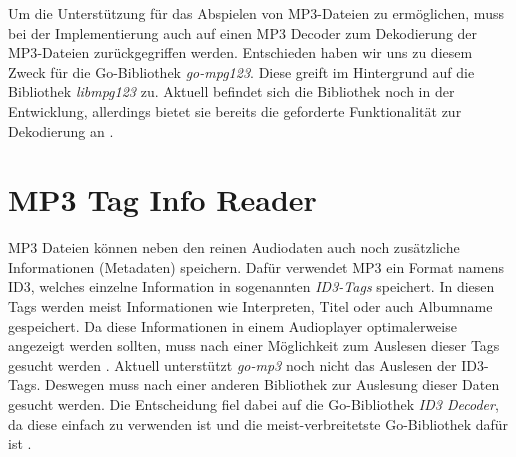 Um die Unterstützung für das Abspielen von \ac{MP3}-Dateien zu ermöglichen, muss bei der Implementierung auch auf einen \ac{MP3} Decoder zum
Dekodierung der \ac{MP3}-Dateien zurückgegriffen werden. Entschieden haben wir uns
zu diesem Zweck für die Go-Bibliothek \textit{go-mpg123}. Diese greift im
Hintergrund auf die Bibliothek \textit{libmpg123} zu. Aktuell befindet sich die Bibliothek
noch in der Entwicklung, allerdings bietet sie bereits die geforderte
Funktionalität zur Dekodierung an \autocite{mp3_decoder}.

\section{MP3 Tag Info Reader}
\ac{MP3} Dateien können neben den reinen Audiodaten auch noch zusätzliche
Informationen (Metadaten) speichern. Dafür verwendet \ac{MP3} ein Format namens
\ac{ID3}, welches einzelne Information in
sogenannten \textit{\ac{ID3}-Tags} speichert. In diesen Tags werden meist
Informationen wie Interpreten, Titel oder auch Albumname gespeichert. Da diese
Informationen in einem Audioplayer optimalerweise angezeigt werden sollten,
muss nach einer Möglichkeit zum Auslesen dieser Tags gesucht werden \autocite{id3}. \hfill
\break
Aktuell unterstützt \textit{go-mp3} noch nicht das Auslesen der \ac{ID3}-Tags.
Deswegen muss nach einer anderen Bibliothek zur Auslesung dieser Daten gesucht
werden. Die Entscheidung fiel dabei auf die Go-Bibliothek \textit{ID3 Decoder},
da diese einfach zu verwenden ist und die meist-verbreitetste Go-Bibliothek
dafür ist \autocite{id3_go_2015}.
